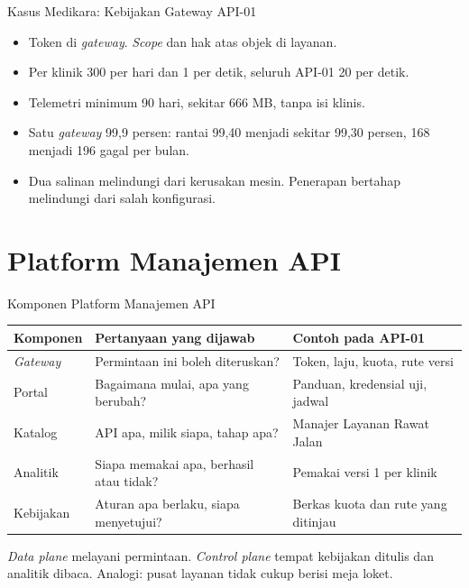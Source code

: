 \documentclass[aspectratio=169, table, 12pt]{beamer}
\begin{document}
\begin{frame}{{\Large Kasus Medikara: Kebijakan Gateway API-01}}
  \vspace{8pt}
  \begin{itemize}
    \item Token di \textit{gateway}. \textit{Scope} dan hak atas objek di layanan.
    \item Per klinik 300 per hari dan 1 per detik, seluruh API-01 20 per detik.
    \item Telemetri minimum 90 hari, sekitar 666 MB, tanpa isi klinis.
    \item Satu \textit{gateway} 99,9 persen: rantai 99,40 menjadi sekitar 99,30 persen, 168 menjadi 196 gagal per bulan.
    \item Dua salinan melindungi dari kerusakan mesin. Penerapan bertahap melindungi dari salah konfigurasi.
  \end{itemize}
\end{frame}

\section{Platform Manajemen API}

\begin{frame}{{\Large Komponen Platform Manajemen API}}
  \footnotesize
  \begin{tabularx}{\textwidth}{>{\raggedright\arraybackslash}p{2.4cm} >{\raggedright\arraybackslash}X >{\raggedright\arraybackslash}p{4.9cm}}
    \hline
    \textbf{Komponen} & \textbf{Pertanyaan yang dijawab} & \textbf{Contoh pada API-01} \\ \hline
    \textit{Gateway} & Permintaan ini boleh diteruskan? & Token, laju, kuota, rute versi \\ \hline
    Portal & Bagaimana mulai, apa yang berubah? & Panduan, kredensial uji, jadwal \\ \hline
    Katalog & API apa, milik siapa, tahap apa? & Manajer Layanan Rawat Jalan \\ \hline
    Analitik & Siapa memakai apa, berhasil atau tidak? & Pemakai versi 1 per klinik \\ \hline
    Kebijakan & Aturan apa berlaku, siapa menyetujui? & Berkas kuota dan rute yang ditinjau \\ \hline
  \end{tabularx}

  \vspace{8pt}
  \small \textit{Data plane} melayani permintaan. \textit{Control plane} tempat kebijakan ditulis dan analitik dibaca. Analogi: pusat layanan tidak cukup berisi meja loket.
\end{frame}
\end{document}

